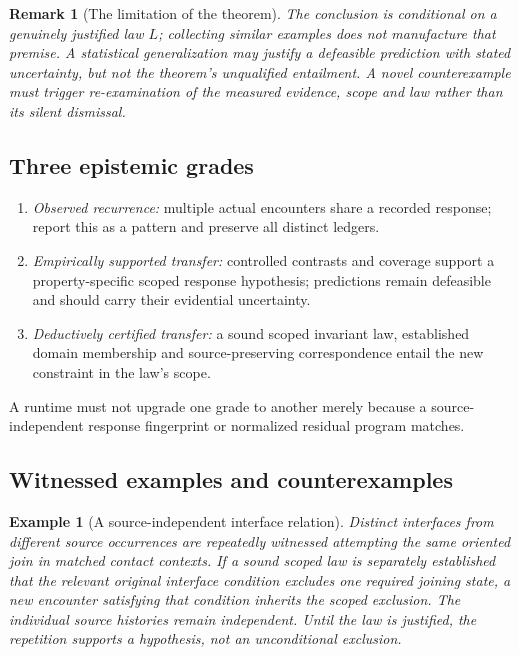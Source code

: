 \documentclass[11pt]{article}
\newtheorem{remark}[definition]{Remark}
\newtheorem{example}[definition]{Example}
\begin{document}
\begin{remark}[The limitation of the theorem]
The conclusion is conditional on a \emph{genuinely
justified} law $L$; collecting similar examples
does not manufacture that premise. A statistical
generalization may justify a defeasible prediction
with stated uncertainty, but not the theorem's
unqualified entailment. A novel counterexample must
trigger re-examination of the measured evidence,
scope and law rather than its silent dismissal.
\end{remark}

\subsection{Three epistemic grades}
\begin{enumerate}[label=(\roman*)]
\item \emph{Observed recurrence:} multiple actual
encounters share a recorded response; report this
as a pattern and preserve all distinct ledgers.
\item \emph{Empirically supported transfer:}
controlled contrasts and coverage support a
property-specific scoped response hypothesis;
predictions remain defeasible and should carry
their evidential uncertainty.
\item \emph{Deductively certified transfer:}
a sound scoped invariant law, established domain
membership and source-preserving correspondence
entail the new constraint in the law's scope.
\end{enumerate}
A runtime must not upgrade one grade to another
merely because a source-independent response
fingerprint or normalized residual program matches.

\subsection{Witnessed examples and counterexamples}
\begin{example}[A source-independent interface relation]
Distinct interfaces from different source occurrences
are repeatedly witnessed attempting the same oriented
join in matched contact contexts. If a sound scoped law
is separately established that the relevant original
interface condition excludes one required joining
state, a new encounter satisfying that condition
inherits the scoped exclusion. The individual source
histories remain independent. Until the law is
justified, the repetition supports a hypothesis,
not an unconditional exclusion.
\end{example}
\end{document}
